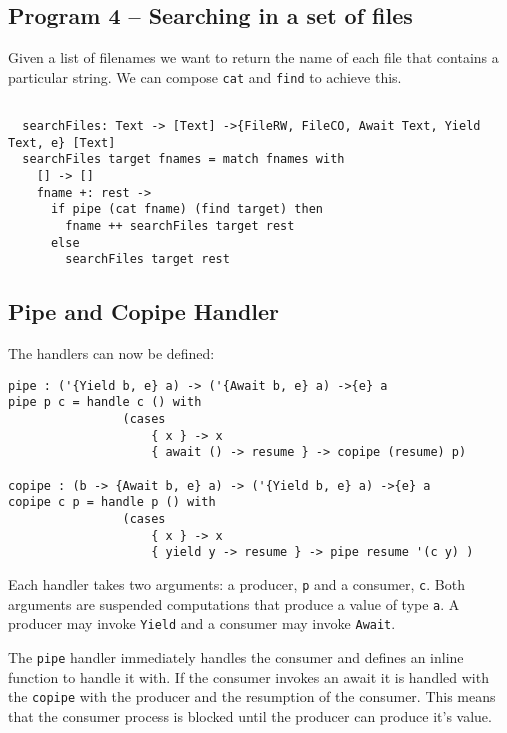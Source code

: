 \documentclass[logo,bsc,singlespacing,parskip]{infthesis}
\begin{document}
\begin{tcolorbox}[colback=gray!10, colframe=black, arc=0pt, outer arc=0pt]
  \section*{Program 4 -- Searching in a set of files}
  
  Given a list of filenames we want to return the name of each file that
  contains a particular string. We can compose \texttt{cat} and \texttt{find}
  to achieve this.

  \begin{lstlisting}[language=unison]
  
  searchFiles: Text -> [Text] ->{FileRW, FileCO, Await Text, Yield Text, e} [Text]
  searchFiles target fnames = match fnames with 
    [] -> []
    fname +: rest -> 
      if pipe (cat fname) (find target) then
        fname ++ searchFiles target rest
      else
        searchFiles target rest

  \end{lstlisting}
\end{tcolorbox}

\subsection{Pipe and Copipe Handler}

The handlers can now be defined:

\begin{lstlisting}[language=unison]
pipe : ('{Yield b, e} a) -> ('{Await b, e} a) ->{e} a
pipe p c = handle c () with
                (cases
                    { x } -> x
                    { await () -> resume } -> copipe (resume) p)

copipe : (b -> {Await b, e} a) -> ('{Yield b, e} a) ->{e} a
copipe c p = handle p () with
                (cases
                    { x } -> x
                    { yield y -> resume } -> pipe resume '(c y) )
\end{lstlisting}

Each handler takes two arguments: a producer, \texttt{p} and a consumer,
\texttt{c}. Both arguments are suspended computations that produce a value of
type \texttt{a}. A producer may invoke \texttt{Yield} and a consumer may invoke
\texttt{Await}.

The \texttt{pipe} handler immediately handles the consumer and defines an
inline function to handle it with. If the consumer invokes an await it is
handled with the \texttt{copipe} with the producer and the resumption of the
consumer. This means that the consumer process is blocked until the producer
can produce it's value.
\end{document}

